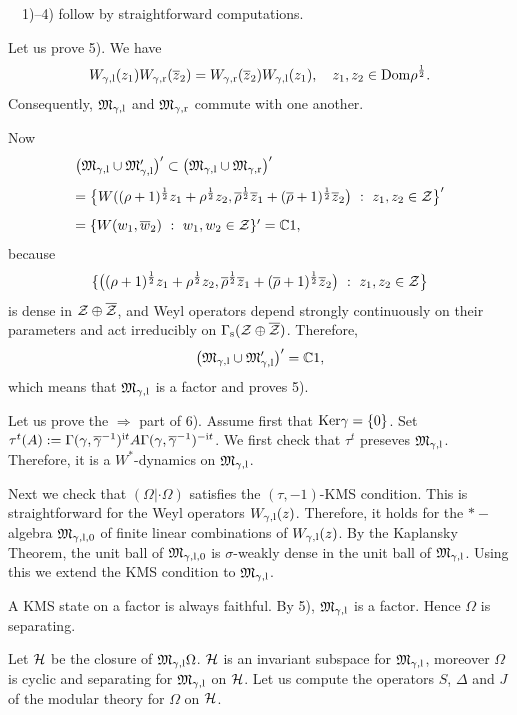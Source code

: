 \documentclass{svmult}
\def\cc{{\mathbb C}}
\def\bar{\overline}
\def\l{{\rm l}}
\def\r{{\rm r}}
\def\s{{\rm s}}
\def\proof{
\noindent{\bf Proof.}\ \ }
\def\cZ{{\cal Z}}
\def\fM{{\mathfrak M}}
\def\i{{\rm i}}
\def\Dom{{\rm Dom}}
\def\Ker{{\rm Ker}}
\def\one{{\bf 1}}
\def\cH{{\cal H}}
\def\l{{\rm l}}
\def\r{{\rm r}}
\def\Ker{{\rm Ker}}
\def\one{{ 1}}
\def\cH{{\cal H}}
\def\s{{\rm s}}
\begin{document}
\proof 1)--4) follow by straightforward computations.

Let us prove 5). We have
\[W_{\gamma,\l}(z_1)W_{\gamma,\r}(\bar z_2)=W_{\gamma,\r}(\bar
z_2)W_{\gamma,\l}(z_1),\ \ \ z_1,z_2\in\Dom\rho^{\frac12}.\]
 Consequently,
 $\fM_{\gamma,\l}$ and $\fM_{\gamma,\r}$ commute with one another.

Now
\[\begin{array}{l}
\bigl(\fM_{\gamma,\l}\cup\fM_{\gamma,\l}'\bigr)'
\subset
\bigl(\fM_{\gamma,\l}\cup\fM_{\gamma,\r}\bigr)'\\[3mm]
=\bigl\{W((\rho+1)^{\frac12} z_1+\rho^{\frac12}z_2,
\bar\rho^{\frac12}\bar z_1+
(\bar\rho+1)^{\frac12} \bar z_2\bigr)\ :\ z_1,z_2\in\cZ
\bigr\}'\\[3mm]
=\{W(w_1,\bar w_2)\ :\ w_1,w_2\in\cZ\}'=\cc\one,\end{array}\]
because
\[\{\bigl((\rho+1)^{\frac12} z_1+\rho^{\frac12}z_2,
\bar\rho^{\frac12}\bar z_1
+(\bar\rho+1)^{\frac12} \bar z_2\bigr)\ :\ z_1,z_2\in\cZ
\bigr\}\]
is dense in $\cZ\oplus\bar\cZ$, and  Weyl operators depend 
strongly continuously on their parameters and act irreducibly on 
$\Gamma_\s(\cZ\oplus\bar\cZ)$. Therefore,
\[\bigl(\fM_{\gamma,\l}\cup\fM_{\gamma,\l}'\bigr)'=\cc\one,\]
which means that $\fM_{\gamma,\l}$ is a factor and proves 5).


Let us prove the $\Rightarrow$ part of 
6). Assume first that $\Ker\gamma=\{0\}$.
Set $\tau^t(A):=\Gamma(\gamma,\bar\gamma^{-1})^{\i t}A
\Gamma(\gamma,\bar\gamma^{-1})^{-\i t}$. We first
check that $\tau^t$ preseves $\fM_{\gamma,\l}$. Therefore, it is a
$W^*$-dynamics on $\fM_{\gamma,\l}$. 

Next we check that  $(\Omega|\cdot\Omega)$ satisfies
  the $(\tau, -1)$-KMS condition.
 This is
straightforward for the Weyl operators $W_{\gamma,\l}(z)$.
 Therefore, it holds for
the $*-$algebra $\fM_{\gamma,\l,0}$ of finite linear combinations of
 $W_{\gamma,\l}(z)$. By the Kaplansky Theorem,
 the unit ball of 
 $\fM_{\gamma,\l,0}$ is $\sigma$-weakly
 dense in the unit ball of
 $\fM_{\gamma,\l}$. Using this we extend the KMS condition to
 $\fM_{\gamma,\l}$.


A KMS state on a factor is always faithful. By 5), $\fM_{\gamma,\l}$ is a
factor. 
Hence
$\Omega$ is separating.

Let $\cH$ be the closure of $\fM_{\gamma,\l}\Omega$.  $\cH$ is an invariant
subspace for $\fM_{\gamma,\l}$, moreover $\Omega$ 
is cyclic and  separating for $\fM_{\gamma,\l}$ on $\cH$.
 Let us compute  the operators $S$, $\Delta$ and $J$ of the modular theory
for $\Omega$ on $\cH$.
\end{document}
